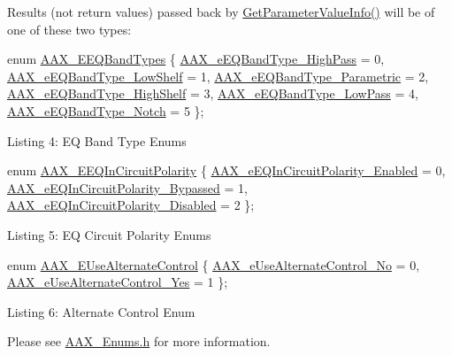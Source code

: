 Results (not return values) passed back by \hyperlink{a00018_a8f0a38e7445a97282ea3a295979bbbea}{Get\+Parameter\+Value\+Info()} will be of one of these two types\+:


\begin{DoxyCode}
\textcolor{keyword}{enum} \hyperlink{a00206_a9ec6da28e827496514bd15d6f2b26d95}{AAX\_EEQBandTypes}
\{
    \hyperlink{a00206_a9ec6da28e827496514bd15d6f2b26d95a7827eec27ad12a8abb7f466c629b6482}{AAX\_eEQBandType\_HighPass} = 0,    
    \hyperlink{a00206_a9ec6da28e827496514bd15d6f2b26d95a3dbff637a879e2f187f9ad1bbb97c8a3}{AAX\_eEQBandType\_LowShelf} = 1,   
    \hyperlink{a00206_a9ec6da28e827496514bd15d6f2b26d95a162d60d2812f3786ef5f87d288193e95}{AAX\_eEQBandType\_Parametric} = 2,
    \hyperlink{a00206_a9ec6da28e827496514bd15d6f2b26d95aa36c45b5f1a3dd677fdb14020b83d16f}{AAX\_eEQBandType\_HighShelf} = 3, 
    \hyperlink{a00206_a9ec6da28e827496514bd15d6f2b26d95a5de1272a9829d9d764a7a25adcdae1eb}{AAX\_eEQBandType\_LowPass} = 4, 
    \hyperlink{a00206_a9ec6da28e827496514bd15d6f2b26d95a5e8aee84ee2cd1db292283e7550e64dc}{AAX\_eEQBandType\_Notch} = 5  
\}; 
\end{DoxyCode}
  Listing 4\+: E\+Q Band Type Enums


\begin{DoxyCode}
\textcolor{keyword}{enum} \hyperlink{a00206_ab5bda96f09874705e9b800d1b1495b48}{AAX\_EEQInCircuitPolarity}
\{
    \hyperlink{a00206_ab5bda96f09874705e9b800d1b1495b48aa1f21f2aa320ece14a9259195d3ee2bd}{AAX\_eEQInCircuitPolarity\_Enabled} = 0,   
    \hyperlink{a00206_ab5bda96f09874705e9b800d1b1495b48aeef37a6376396f07977b4c233985dfe6}{AAX\_eEQInCircuitPolarity\_Bypassed} = 1, 
    \hyperlink{a00206_ab5bda96f09874705e9b800d1b1495b48a4a85b608d03de4997616de1e95610208}{AAX\_eEQInCircuitPolarity\_Disabled} = 2  
\}; 
\end{DoxyCode}
  Listing 5\+: E\+Q Circuit Polarity Enums


\begin{DoxyCode}
\textcolor{keyword}{enum} \hyperlink{a00206_abbcc8b4e8207262a5dd9e32047a51a29}{AAX\_EUseAlternateControl}
\{
    \hyperlink{a00206_abbcc8b4e8207262a5dd9e32047a51a29a5cfea068cc7ea51becccc9d26955e443}{AAX\_eUseAlternateControl\_No} = 0,
    \hyperlink{a00206_abbcc8b4e8207262a5dd9e32047a51a29aa63097dc0b27e51411f30b06b2db26f1}{AAX\_eUseAlternateControl\_Yes} = 1
\};  
\end{DoxyCode}
  Listing 6\+: Alternate Control Enum

Please see \hyperlink{a00206}{A\+A\+X\+\_\+\+Enums.\+h} for more information.

